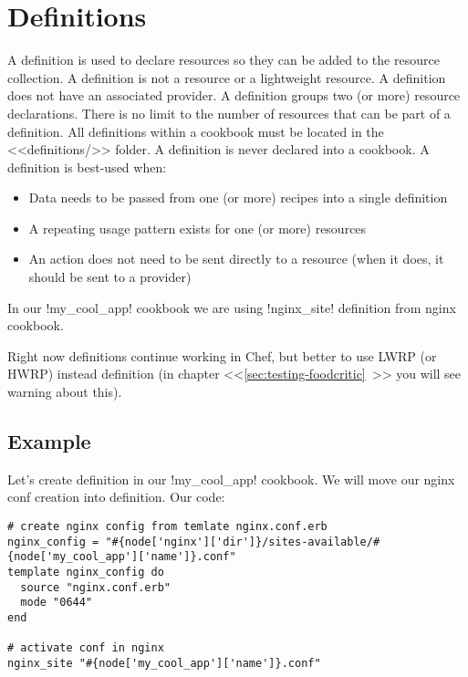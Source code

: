 \section{Definitions}
\label{sec:cookbook-definitions}

A definition is used to declare resources so they can be added to the resource collection. A definition is not a resource or a lightweight resource. A definition does not have an associated provider. A definition groups two (or more) resource declarations. There is no limit to the number of resources that can be part of a definition. All definitions within a cookbook must be located in the <<definitions/>> folder. A definition is never declared into a cookbook. A definition is best-used when:

\begin{itemize}
  \item Data needs to be passed from one (or more) recipes into a single definition
  \item A repeating usage pattern exists for one (or more) resources
  \item An action does not need to be sent directly to a resource (when it does, it should be sent to a provider)
\end{itemize}

In our \inline!my_cool_app! cookbook we are using \inline!nginx_site! definition from nginx cookbook.

Right now definitions continue working in Chef, but better to use LWRP (or HWRP) instead definition (in chapter <<\ref{sec:testing-foodcritic}~>> you will see warning about this).

\subsection{Example}

Let's create definition in our \inline!my_cool_app! cookbook. We will move our nginx conf creation into definition. Our code:

\begin{lstlisting}[label=lst:cookbook-definitions-default1,title=my-server-cloud/site-cookbooks/my\_cool\_app/recipes/default.rb]
# create nginx config from temlate nginx.conf.erb
nginx_config = "#{node['nginx']['dir']}/sites-available/#{node['my_cool_app']['name']}.conf"
template nginx_config do
  source "nginx.conf.erb"
  mode "0644"
end

# activate conf in nginx
nginx_site "#{node['my_cool_app']['name']}.conf"
\end{lstlisting}

